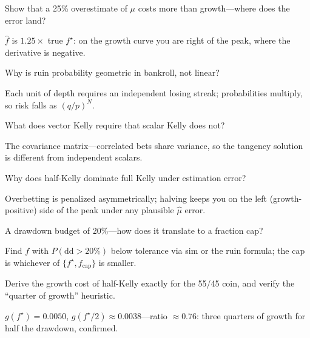 \begin{exercise}
Show that a 25\% overestimate of $\mu$ costs more than growth---where does the error land?
\end{exercise}
\begin{solution}
$\hat f$ is $1.25\times$ true $f^\star$: on the growth curve you are right of the peak,
where the derivative is negative.
\end{solution}

\begin{exercise}
Why is ruin probability geometric in bankroll, not linear?
\end{exercise}
\begin{solution}
Each unit of depth requires an independent losing streak; probabilities multiply,
so risk falls as $(q/p)^N$.
\end{solution}

\begin{exercise}
What does vector Kelly require that scalar Kelly does not?
\end{exercise}
\begin{solution}
The covariance matrix---correlated bets share variance, so the tangency solution is
different from independent scalars.
\end{solution}

\begin{exercise}
Why does half-Kelly dominate full Kelly under estimation error?
\end{exercise}
\begin{solution}
Overbetting is penalized asymmetrically; halving keeps you on the left (growth-positive)
side of the peak under any plausible $\hat\mu$ error.
\end{solution}

\begin{exercise}
A drawdown budget of 20\%---how does it translate to a fraction cap?
\end{exercise}
\begin{solution}
Find $f$ with $P(\text{dd}>20\%)$ below tolerance via sim or the ruin formula; the cap
is whichever of $\{f^\star, f_{\text{cap}}\}$ is smaller.
\end{solution}

\begin{exercise}[hard]
Derive the growth cost of half-Kelly exactly for the 55/45 coin, and verify the
``quarter of growth'' heuristic.
\end{exercise}
\begin{solution}
$g(f^\star)=0.0050$, $g(f^\star/2)\approx0.0038$---ratio $\approx0.76$: three quarters
of growth for half the drawdown, confirmed.
\end{solution}

